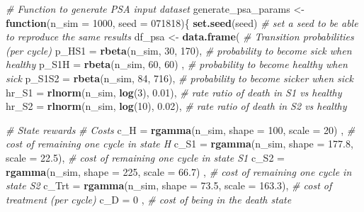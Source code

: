 \documentclass[
]{article}
\newenvironment{Shaded}{\begin{snugshade}}{\end{snugshade}}
\newcommand{\CommentTok}[1]{\textcolor[rgb]{0.56,0.35,0.01}{\textit{#1}}}
\newcommand{\ControlFlowTok}[1]{\textcolor[rgb]{0.13,0.29,0.53}{\textbf{#1}}}
\newcommand{\DataTypeTok}[1]{\textcolor[rgb]{0.13,0.29,0.53}{#1}}
\newcommand{\DecValTok}[1]{\textcolor[rgb]{0.00,0.00,0.81}{#1}}
\newcommand{\FloatTok}[1]{\textcolor[rgb]{0.00,0.00,0.81}{#1}}
\newcommand{\KeywordTok}[1]{\textcolor[rgb]{0.13,0.29,0.53}{\textbf{#1}}}
\newcommand{\NormalTok}[1]{#1}
\newcommand{\StringTok}[1]{\textcolor[rgb]{0.31,0.60,0.02}{#1}}
\begin{document}
\begin{Shaded}
\begin{Highlighting}[]
\CommentTok{# Function to generate PSA input dataset}
\NormalTok{generate_psa_params <-}\StringTok{ }\ControlFlowTok{function}\NormalTok{(}\DataTypeTok{n_sim =} \DecValTok{1000}\NormalTok{, }\DataTypeTok{seed =} \DecValTok{071818}\NormalTok{)\{}
  \KeywordTok{set.seed}\NormalTok{(seed) }\CommentTok{# set a seed to be able to reproduce the same results}
\NormalTok{  df_psa <-}\StringTok{ }\KeywordTok{data.frame}\NormalTok{(}
    \CommentTok{# Transition probabilities (per cycle)}
    \DataTypeTok{p_HS1   =} \KeywordTok{rbeta}\NormalTok{(n_sim, }\DecValTok{30}\NormalTok{, }\DecValTok{170}\NormalTok{),  }\CommentTok{# probability to become sick when healthy}
    \DataTypeTok{p_S1H   =} \KeywordTok{rbeta}\NormalTok{(n_sim, }\DecValTok{60}\NormalTok{, }\DecValTok{60}\NormalTok{) ,  }\CommentTok{# probability to become healthy when sick}
    \DataTypeTok{p_S1S2  =} \KeywordTok{rbeta}\NormalTok{(n_sim, }\DecValTok{84}\NormalTok{, }\DecValTok{716}\NormalTok{),  }\CommentTok{# probability to become sicker when sick}
    \DataTypeTok{hr_S1   =} \KeywordTok{rlnorm}\NormalTok{(n_sim, }\KeywordTok{log}\NormalTok{(}\DecValTok{3}\NormalTok{),  }\FloatTok{0.01}\NormalTok{), }\CommentTok{# rate ratio of death in S1 vs healthy}
    \DataTypeTok{hr_S2   =} \KeywordTok{rlnorm}\NormalTok{(n_sim, }\KeywordTok{log}\NormalTok{(}\DecValTok{10}\NormalTok{), }\FloatTok{0.02}\NormalTok{), }\CommentTok{# rate ratio of death in S2 vs healthy }
    
    \CommentTok{# State rewards}
    \CommentTok{# Costs}
    \DataTypeTok{c_H   =} \KeywordTok{rgamma}\NormalTok{(n_sim, }\DataTypeTok{shape =} \DecValTok{100}\NormalTok{, }\DataTypeTok{scale =} \DecValTok{20}\NormalTok{)    , }\CommentTok{# cost of remaining one cycle in state H}
    \DataTypeTok{c_S1  =} \KeywordTok{rgamma}\NormalTok{(n_sim, }\DataTypeTok{shape =} \FloatTok{177.8}\NormalTok{, }\DataTypeTok{scale =} \FloatTok{22.5}\NormalTok{), }\CommentTok{# cost of remaining one cycle in state S1}
    \DataTypeTok{c_S2  =} \KeywordTok{rgamma}\NormalTok{(n_sim, }\DataTypeTok{shape =} \DecValTok{225}\NormalTok{, }\DataTypeTok{scale =} \FloatTok{66.7}\NormalTok{)  , }\CommentTok{# cost of remaining one cycle in state S2}
    \DataTypeTok{c_Trt =} \KeywordTok{rgamma}\NormalTok{(n_sim, }\DataTypeTok{shape =} \FloatTok{73.5}\NormalTok{, }\DataTypeTok{scale =} \FloatTok{163.3}\NormalTok{), }\CommentTok{# cost of treatment (per cycle)}
    \DataTypeTok{c_D   =} \DecValTok{0}\NormalTok{                                         , }\CommentTok{# cost of being in the death state}
    

\end{Highlighting}
\end{Shaded}
\end{document}
